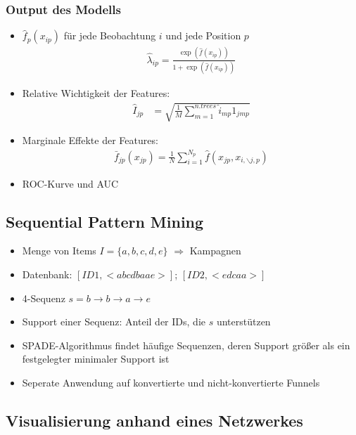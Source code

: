 \begin{frame}\frametitle{Output des Modells}
	\begin{itemize}
		\item $\hat{f}_p(x_{ip})$ für jede Beobachtung $i$ und jede Position $p$
			\begin{align*}
				\hat{\lambda}_{ip} = \frac{\exp(\hat{f}(x_{ip}))}{1+\exp(\hat{f}(x_{ip}))}
			\end{align*}
		\item Relative Wichtigkeit der Features:
			\begin{align*}
				\hat{I}_{jp} &= \sqrt{\frac{1}{M} \sum_{m=1}^{n.trees} \hat{i}_{mp} 1_{jmp}}
			\end{align*}
		\item Marginale Effekte der Features:
			\begin{align*}
				\bar{f}_{jp}(x_{jp}) = \frac{1}{N} \sum_{i=1}^{N_p} \hat{f}(x_{jp},x_{i,\backslash j,p})
			\end{align*}
		\item ROC-Kurve und AUC
	\end{itemize}
\end{frame}

\subsection{Sequential Pattern Mining}

\begin{frame}
	\begin{itemize}
		\item Menge von Items $I = \{a, b, c, d, e\}$ $\Rightarrow$ Kampagnen
		\item Datenbank: $[ID 1, <abcdbaae>]$; $[ID 2, <edcaa>]$
		\item 4-Sequenz $s = b\rightarrow b\rightarrow a\rightarrow e$
		\item Support einer Sequenz: Anteil der IDs, die $s$ unterstützen
		\item SPADE-Algorithmus findet häufige Sequenzen, deren Support größer als ein festgelegter minimaler Support ist
		\item Seperate Anwendung auf konvertierte und nicht-konvertierte Funnels
	\end{itemize}
\end{frame}

\subsection{Visualisierung anhand eines Netzwerkes}

